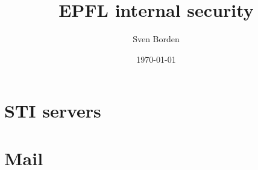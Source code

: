 \documentclass[12pt]{report}
\title{EPFL internal security}
\author{Sven Borden}
\date{\today}
\begin{document}
	\maketitle
	\tableofcontents
	\clearpage
	\chapter{STI servers}
	
	\chapter{Mail}
	
\end{document}
